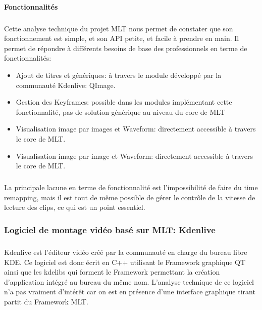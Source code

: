 \newpage\paragraph{Fonctionnalités}

\subparagraph{ }

Cette analyse technique du projet MLT nous permet de constater
que son fonctionnement est simple, et son API petite, et facile à
prendre en main.  Il permet de répondre à différents besoins de base
des professionnels en terme de fonctionnalités:

\begin{itemize}

  \item {Ajout de titres et génériques: à travers le module développé
  par la communauté Kdenlive: QImage.}

  \item {Gestion des Keyframes: possible dans les modules implémentant
    cette fonctionnalité, pas de solution générique au niveau du core
    de MLT}

  \item {Visualisation image par images et Waveform: directement
  accessible à travers le core de MLT.}

  \item {Visualisation image par image et Waveform: directement accessible
  à travers le core de MLT.}

\end{itemize}

\subparagraph{}

La principale lacune en terme de fonctionnalité est l'impossibilité de
faire du time remapping, mais il est tout de même possible de gérer
le contrôle de la vitesse de lecture des clips, ce qui est un point
essentiel.

\subsubsection {Logiciel de montage vidéo basé sur MLT:
Kdenlive}

\subparagraph{}

Kdenlive est l'éditeur vidéo créé par la communauté en charge
du bureau libre KDE. Ce logiciel est donc écrit en C++ utilisant le
Framework graphique QT  ainsi que les kdelibs qui forment le Framework
permettant la création d'application intégré au bureau du même nom.
L'analyse technique de ce logiciel n'a pas vraiment d'intérêt car on
est en présence d'une interface graphique tirant partit du Framework
MLT.

